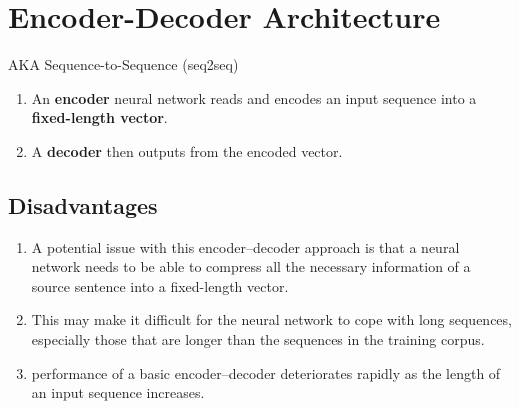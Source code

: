 \chapter{Encoder-Decoder Architecture}

AKA Sequence-to-Sequence (seq2seq)

\begin{enumerate}
    \item An \textbf{encoder} neural network reads and encodes an input sequence into a \textbf{fixed-length vector}. 
    \hfill \cite{adv-ml-tech/paper/arxiv.org/1409.0473}
    
    \item A \textbf{decoder} then outputs from the encoded vector.
    \hfill \cite{adv-ml-tech/paper/arxiv.org/1409.0473}
\end{enumerate}


\section{Disadvantages}
\begin{enumerate}
    \item A potential issue with this encoder–decoder approach is that a neural network needs to be able to compress all the necessary information of a source sentence into a fixed-length vector.
    \hfill \cite{adv-ml-tech/paper/arxiv.org/1409.0473}

    \item This may make it difficult for the neural network to cope with long sequences, especially those that are longer than the sequences in the training corpus. 
    \hfill \cite{adv-ml-tech/paper/arxiv.org/1409.0473}

    \item  performance of a basic encoder–decoder deteriorates rapidly as the length of an input sequence increases.
    \hfill \cite{adv-ml-tech/paper/arxiv.org/1409.0473}
\end{enumerate}












